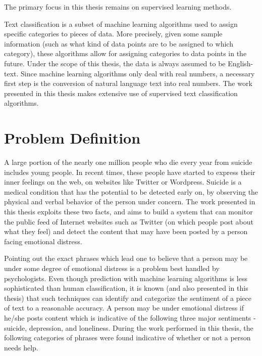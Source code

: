 The primary focus in this thesis remains on supervised learning methods.

Text classification is a subset of machine learning algorithms used to assign specific categories to pieces of data. More precisely, given some sample information (such as what kind of data points are to be assigned to which category), these algorithms allow for assigning categories to data points in the future. Under the scope of this thesis, the data is always assumed to be English-text. Since machine learning algorithms only deal with real numbers, a necessary first step is the conversion of natural language text into real numbers. The work presented in this thesis makes extensive use of supervised text classification algorithms.

\section{Problem Definition}
A large portion of the nearly one million people who die every year from suicide includes young people. In recent times, these people have started to express their inner feelings on the web, on websites like Twitter or Wordpress. Suicide is a medical condition that has the potential to be detected early on, by observing the physical and verbal behavior of the person under concern. The work presented in this thesis exploits these two facts, and aims to build a system that can monitor the public feed of Internet websites such as Twitter (on which people post about what they feel) and detect the content that may have been posted by a person facing emotional distress.

Pointing out the exact phrases which lead one to believe that a person may be under some degree of emotional distress is a problem best handled by psychologists. Even though prediction with machine learning algorithms is less sophisticated than human classification, it is known (and also presented in this thesis) that such techniques can identify and categorize the sentiment of a piece of text to a reasonable accuracy. A person may be under emotional distress if he/she posts content which is indicative of the following three major sentiments - suicide, depression, and loneliness. During the work performed in this thesis, the following categories of phrases were found indicative of whether or not a person needs help.

